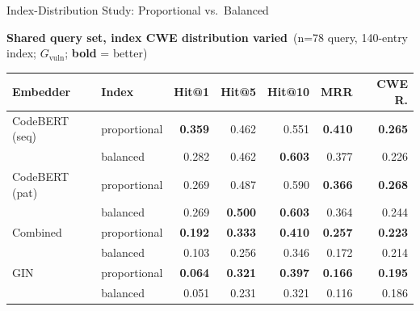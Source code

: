 \documentclass[aspectratio=169,10pt]{beamer}
\begin{document}


\begin{frame}{Index-Distribution Study: Proportional vs.\ Balanced}

  \begin{center}
    {\small\textbf{Shared query set, index CWE distribution varied}\ {\scriptsize(n=78 query, 140-entry index; $G_{\mathrm{vuln}}$; \textbf{bold} = better)}}\\[4pt]
  {\scriptsize
  \renewcommand{\arraystretch}{1.18}
  \setlength{\tabcolsep}{4pt}
    \begin{tabular}{llrrrrr}
      \toprule
      \textbf{Embedder} & \textbf{Index} & \textbf{Hit@1} & \textbf{Hit@5} & \textbf{Hit@10} & \textbf{MRR} & \textbf{CWE R.} \\
      \midrule
      CodeBERT (seq) & proportional & \textbf{0.359} & 0.462 & 0.551 & \textbf{0.410} & \textbf{0.265} \\
                     & balanced     & 0.282 & 0.462 & \textbf{0.603} & 0.377 & 0.226 \\
      \midrule
      CodeBERT (pat) & proportional & 0.269 & 0.487 & 0.590 & \textbf{0.366} & \textbf{0.268} \\
                     & balanced     & 0.269 & \textbf{0.500} & \textbf{0.603} & 0.364 & 0.244 \\
      \midrule
      Combined & proportional & \textbf{0.192} & \textbf{0.333} & \textbf{0.410} & \textbf{0.257} & \textbf{0.223} \\
               & balanced     & 0.103 & 0.256 & 0.346 & 0.172 & 0.214 \\
      \midrule
      GIN & proportional & \textbf{0.064} & \textbf{0.321} & \textbf{0.397} & \textbf{0.166} & \textbf{0.195} \\
          & balanced     & 0.051 & 0.231 & 0.321 & 0.116 & 0.186 \\
      \bottomrule
    \end{tabular}}
  \end{center}


\end{frame}
\end{document}
